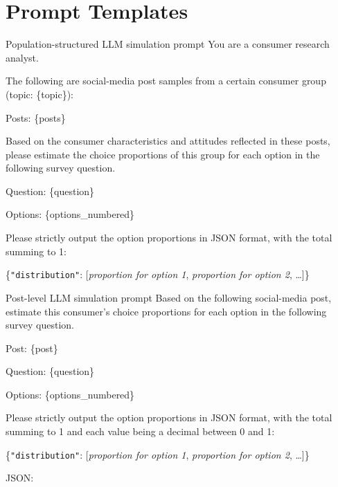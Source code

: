 \documentclass{article}
\begin{document}
\section{Prompt Templates}
\label{app:prompts}

\begin{promptbox}[label={prompt:cluster-llm}]{Population-structured LLM simulation prompt}
You are a consumer research analyst.

The following are social-media post samples from a certain consumer group
(topic: \{topic\}):

Posts: \{posts\}

Based on the consumer characteristics and attitudes reflected in these posts,
please estimate the choice proportions of this group for each option in the
following survey question.

Question: \{question\}

Options: \{options\_numbered\}

Please strictly output the option proportions in JSON format, with the total
summing to 1:

\{\texttt{"distribution"}: [\textit{proportion for option 1},
\textit{proportion for option 2}, \ldots]\}
\end{promptbox}

\begin{promptbox}[label={prompt:post-llm}]{Post-level LLM simulation prompt}
Based on the following social-media post, estimate this consumer's choice
proportions for each option in the following survey question.

Post: \{post\}

Question: \{question\}

Options: \{options\_numbered\}

Please strictly output the option proportions in JSON format, with the total
summing to 1 and each value being a decimal between 0 and 1:

\{\texttt{"distribution"}: [\textit{proportion for option 1},
\textit{proportion for option 2}, \ldots]\}

JSON:
\end{promptbox}


\newpage

\end{document}
